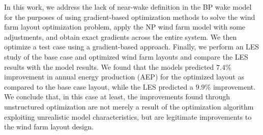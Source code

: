 \documentclass[conf]{new-aiaa}
\begin{document}
%
%
%
%
%
%
%
%

 In this work, we address the lack of near-wake definition in the BP wake model for the purposes of using gradient-based optimization methods to solve the wind farm layout optimization problem, apply the NP wind farm model with some adjustments, and obtain exact gradients across the entire system. We then optimize a test case using a gradient-based approach. Finally, we perform an LES study of the base case and optimized wind farm layouts and compare the LES results with the model results. We found that the models predicted $7.4\%$ improvement in annual energy production (AEP) for the optimized layout as compared to the base case layout, while the LES predicted a $9.9\%$ improvement. We conclude that, in this case at least, the improvements found through unstructured optimization are not merely a result of the optimization algorithm exploiting unrealistic model characteristics, but are legitimate improvements to the wind farm layout design.
\end{document}
